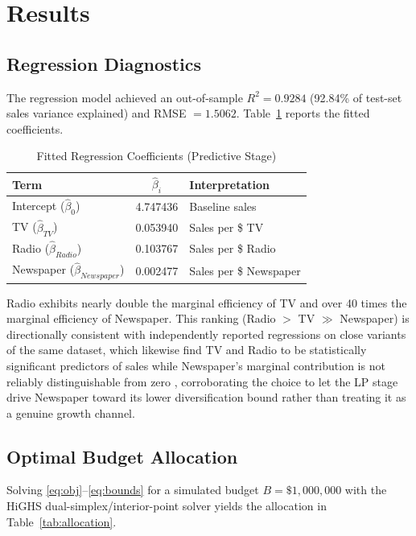 \documentclass[conference]{IEEEtran}
\begin{document}
\section{Results}
\label{sec:results}

\subsection{Regression Diagnostics}
The regression model achieved an out-of-sample $R^2 = 0.9284$ (92.84\% of test-set sales variance explained) and RMSE $=1.5062$. Table~\ref{tab:coefs} reports the fitted coefficients.

\begin{table}[t]
\caption{Fitted Regression Coefficients (Predictive Stage)}
\label{tab:coefs}
\centering
\small
\begin{tabular}{lcp{2.1cm}}
\toprule
\textbf{Term} & \textbf{$\hat\beta_i$} & \textbf{Interpretation} \\
\midrule
Intercept ($\hat\beta_0$) & 4.747436 & Baseline sales \\
TV ($\hat\beta_{TV}$) & 0.053940 & Sales per \$ TV \\
Radio ($\hat\beta_{Radio}$) & 0.103767 & Sales per \$ Radio \\
Newspaper ($\hat\beta_{Newspaper}$) & 0.002477 & Sales per \$ Newspaper \\
\bottomrule
\end{tabular}
\end{table}

Radio exhibits nearly double the marginal efficiency of TV and over 40 times the marginal efficiency of Newspaper. This ranking (Radio $>$ TV $\gg$ Newspaper) is directionally consistent with independently reported regressions on close variants of the same dataset, which likewise find TV and Radio to be statistically significant predictors of sales while Newspaper's marginal contribution is not reliably distinguishable from zero \cite{krasi_github}, corroborating the choice to let the LP stage drive Newspaper toward its lower diversification bound rather than treating it as a genuine growth channel.

\subsection{Optimal Budget Allocation}
Solving \eqref{eq:obj}--\eqref{eq:bounds} for a simulated budget $B = \$1{,}000{,}000$ with the HiGHS dual-simplex/interior-point solver yields the allocation in Table~\ref{tab:allocation}.
\end{document}
